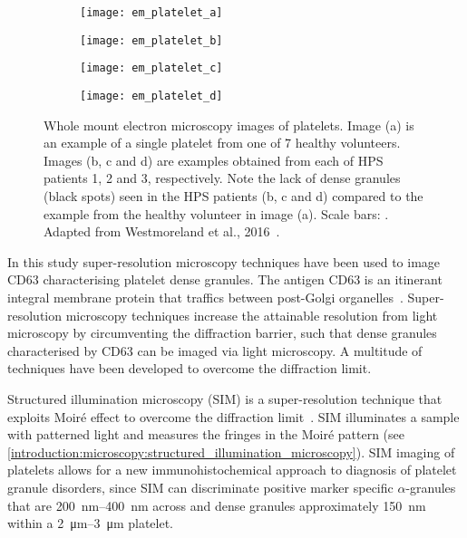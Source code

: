 \begin{figure}[htbp]\centering
	\begin{subfigure}[b]{0.245\linewidth}
		\centering
		\texttt{[image: em\_platelet\_a]}
		\caption{}
		\label{figure:introduction:em_platelet_a}
		\vspace{1ex}
	\end{subfigure}
	\begin{subfigure}[b]{0.245\linewidth}
		\centering
		\texttt{[image: em\_platelet\_b]}
		\caption{}
		\label{figure:introduction:em_platelet_b}
		\vspace{1ex}
	\end{subfigure}
	\begin{subfigure}[b]{0.245\linewidth}
		\centering
		\texttt{[image: em\_platelet\_c]}
		\caption{}
		\label{figure:introduction:em_platelet_c}
		\vspace{1ex}
	\end{subfigure}
	\begin{subfigure}[b]{0.245\linewidth}
		\centering
		\texttt{[image: em\_platelet\_d]}
		\caption{}
		\label{figure:introduction:em_platelet_d}
		\vspace{1ex}
	\end{subfigure}
\caption[Whole mount electron microscopy images of platelets]{Whole mount electron microscopy images of platelets. Image (a) is an example of a single platelet from one of 7 healthy volunteers. Images (b, c and d) are examples obtained from each of HPS patients 1, 2 and 3, respectively. Note the lack of dense granules (black spots) seen in the HPS patients (b, c and d) compared to the example from the healthy volunteer in image (a). Scale bars: . Adapted from Westmoreland et al., 2016~\cite{Westmoreland2016}.}
\label{figure:introduction:em_platelet}
\end{figure}

In this study super-resolution microscopy techniques have been used to image CD63 characterising platelet dense granules. The antigen CD63 is an itinerant integral membrane protein that traffics between post-Golgi organelles~\cite{Pols2009}. Super-resolution microscopy techniques increase the attainable resolution from light microscopy by circumventing the diffraction barrier, such that dense granules characterised by CD63 can be imaged via light microscopy. A multitude of techniques have been developed to overcome the diffraction limit.

Structured illumination microscopy (SIM) is a super-resolution technique that exploits Moir\'e effect to overcome the diffraction limit~\cite{Gustafsson2005}. SIM illuminates a sample with patterned light and measures the fringes in the Moir\'e pattern (see \autoref{introduction:microscopy:structured_illumination_microscopy}). SIM imaging of platelets allows for a new immunohistochemical approach to diagnosis of platelet granule disorders, since SIM can discriminate positive marker specific $\alpha$-granules that are \SIrange{200}{400}{\nano\meter} across and dense granules approximately \SI{150}{\nano\meter} within a \SIrange{2}{3}{\micro\meter} platelet.

